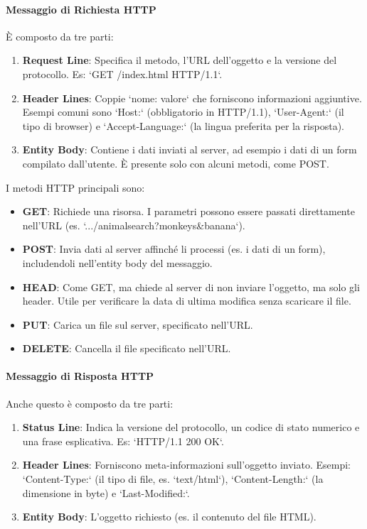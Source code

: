 \paragraph{Messaggio di Richiesta HTTP}
È composto da tre parti:
\begin{enumerate}
    \item \textbf{Request Line}: Specifica il metodo, l'URL dell'oggetto e la versione del protocollo. Es: `GET /index.html HTTP/1.1`.
    \item \textbf{Header Lines}: Coppie `nome: valore` che forniscono informazioni aggiuntive. Esempi comuni sono `Host:` (obbligatorio in HTTP/1.1), `User-Agent:` (il tipo di browser) e `Accept-Language:` (la lingua preferita per la risposta).
    \item \textbf{Entity Body}: Contiene i dati inviati al server, ad esempio i dati di un form compilato dall'utente. È presente solo con alcuni metodi, come POST.
\end{enumerate}

I metodi HTTP principali sono:
\begin{itemize}
    \item \textbf{GET}: Richiede una risorsa. I parametri possono essere passati direttamente nell'URL (es. `.../animalsearch?monkeys\&banana`).
    \item \textbf{POST}: Invia dati al server affinché li processi (es. i dati di un form), includendoli nell'entity body del messaggio.
    \item \textbf{HEAD}: Come GET, ma chiede al server di non inviare l'oggetto, ma solo gli header. Utile per verificare la data di ultima modifica senza scaricare il file.
    \item \textbf{PUT}: Carica un file sul server, specificato nell'URL.
    \item \textbf{DELETE}: Cancella il file specificato nell'URL.
\end{itemize}

\paragraph{Messaggio di Risposta HTTP}
Anche questo è composto da tre parti:
\begin{enumerate}
    \item \textbf{Status Line}: Indica la versione del protocollo, un codice di stato numerico e una frase esplicativa. Es: `HTTP/1.1 200 OK`.
    \item \textbf{Header Lines}: Forniscono meta-informazioni sull'oggetto inviato. Esempi: `Content-Type:` (il tipo di file, es. `text/html`), `Content-Length:` (la dimensione in byte) e `Last-Modified:`.
    \item \textbf{Entity Body}: L'oggetto richiesto (es. il contenuto del file HTML).
\end{enumerate}

